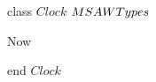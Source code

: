 






\begin{vdm}
{\small\sf class} $Clock$  \kISO $\index{MSAWTypes|ClassOcc}MSAWTypes$
\begin{methdef}
\begin{method}{Now}
\parms{}\\
\Inys 
\end{method}
\end{methdef}
{\small\sf end} $Clock$

\end{vdm}